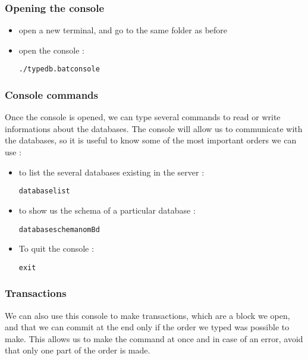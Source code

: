 \documentclass[runningheads]{llncs}
\begin{document}
\subsubsection{Opening the console}
\begin{itemize}
\item open a new terminal, and go to the same folder as before
\item open the console :   \begin{alltt}./typedb.bat console\end{alltt}     
\end{itemize}

\subsubsection{Console commands}

Once the console is opened, we can type several commands to read or write informations about the databases. The console will allow us to communicate with the databases, so it is useful to know some of the most important orders we can use :

\begin{itemize}
\item to list the several databases existing in the server :    \begin{alltt}database list\end{alltt}       
\item to show us the schema of a particular database :    \begin{alltt}database schema nomBd\end{alltt}       
\item To quit the console :                        \begin{alltt}exit\end{alltt}  
\end{itemize}

  \subsubsection{Transactions}
We can also use this console to make transactions, which are a block we open, and that we can commit at the end only if the order we typed was possible to make. This allows us to make the command at once and in case of an error, avoid that only one part of the order is made.
\end{document}
